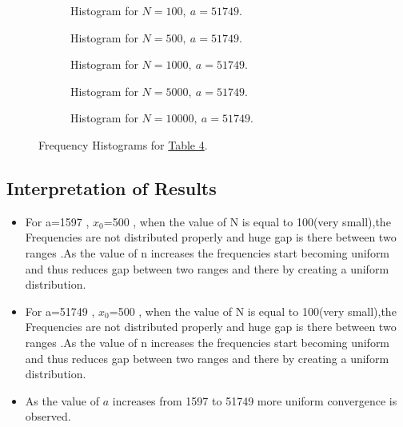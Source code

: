 \documentclass[10pt]{article}
\begin{document}
\pagebreak

\begin{figure}[H]
	\centering
	\begin{subfigure}{0.5\textwidth}
		\centering
		\caption{Histogram for $N = 100,\:a = 51749$.}
		\label{fig:q2_f2_a}
	\end{subfigure}%
	\begin{subfigure}{0.5\textwidth}
		\centering
		\caption{Histogram for $N = 500,\:a = 51749$.}
		\label{fig:q2_f2_b}
	\end{subfigure}
	\begin{subfigure}{0.5\textwidth}
		\centering
		\caption{Histogram for $N = 1000,\:a = 51749$.}
		\label{fig:q2_f2_c}
	\end{subfigure}%
	\begin{subfigure}{0.5\textwidth}
		\centering
		\caption{Histogram for $N = 5000,\:a = 51749$.}
		\label{fig:q2_f2_d}
	\end{subfigure}
	\begin{subfigure}{0.5\textwidth}
		\centering
		\caption{Histogram for $N = 10000,\:a = 51749$.}
		\label{fig:q2_f2_e}
	\end{subfigure}
	\caption{Frequency Histograms for \hyperref[tab:q2_seq2]{Table 4}.}
	\label{fig:q2_f2}
\end{figure}

\pagebreak

\subsection{Interpretation of Results}
\begin{itemize}
\item For a=1597 , $x_0$=500 , when the value of N is equal to 100(very small),the Frequencies are not distributed properly and huge gap is there between two ranges .As the value of n increases the frequencies start becoming uniform and thus reduces gap between two ranges and there by creating a uniform distribution. 
\item For a=51749 , $x_0$=500 , when the value of N is equal to 100(very small),the Frequencies are not distributed properly and huge gap is there between two ranges .As the value of n increases the frequencies start becoming uniform and thus reduces gap between two ranges and there by creating a uniform distribution. 
\item As the value of $a$  increases from 1597 to 51749 more uniform convergence is observed.
\end{itemize}
\pagebreak
\end{document}
